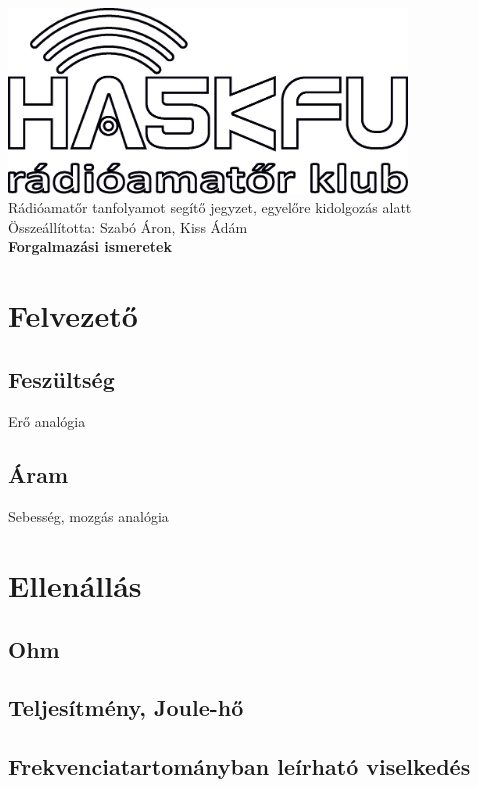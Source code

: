 \documentclass[12pt,a4paper]{article}
\begin{document}
\begin{center}
\includegraphics[width=300pt,keepaspectratio]{figures/ha5kfu.eps}
\\[0.5cm]
Rádióamatőr tanfolyamot segítő jegyzet, egyelőre kidolgozás alatt \\
Összeállította: Szabó Áron, Kiss Ádám %
\\[1cm]

{\huge \bfseries Forgalmazási ismeretek \\[2cm]}



\end{center}

\renewcommand{\contentsname}{Tartalom}\tableofcontents 
\newpage
\section{Felvezető}
\subsection{Feszültség}
Erő analógia
\subsection{Áram}
Sebesség, mozgás analógia

\section{Ellenállás}
\subsection{Ohm}
\subsection{Teljesítmény, Joule-hő}
\subsection{Frekvenciatartományban leírható viselkedés}
\end{document}
